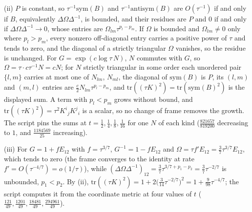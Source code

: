 (ii) $P$ is constant, so $\tau^{-1}\mathrm{sym}(B)$ and $\tau^{-1}\mathrm{antisym}(B)$ are $O(\tau^{-1})$ if and only if $B$, equivalently $\Delta\Omega\Delta^{-1}$, is bounded, and their residues are $P$ and $0$ if and only if $\Delta\Omega\Delta^{-1} \to 0$, whose entries are $\Omega_{lm}\tau^{p_{l} - p_{m}}$. If $\Omega$ is bounded and $\Omega_{lm} \neq 0$ only where $p_{l} > p_{m}$, every nonzero off-diagonal entry carries a positive power of $\tau$ and tends to zero, and the diagonal of a strictly triangular $\Omega$ vanishes, so the residue is unchanged. For $G = \exp(c\log\tau\,N)$, $N$ commutes with $G$, so $\Omega = \tau\cdot c\tau^{-1}N = cN$; for $N$ strictly triangular in some order each unordered pair $\{l, m\}$ carries at most one of $N_{lm}$, $N_{ml}$, the diagonal of $\mathrm{sym}(B)$ is $P$, its $(l,m)$ and $(m,l)$ entries are $\tfrac{c}{2}N_{lm}\tau^{p_{l} - p_{m}}$, and $\mathrm{tr}((\tau K)^{2}) = \mathrm{tr}(\mathrm{sym}(B)^{2})$ is the displayed sum. A term with $p_{l} < p_{m}$ grows without bound, and $\mathrm{tr}((\tau K)^{2}) = \tau^{2}K^{i}{}_{j}K^{j}{}_{i}$ is a scalar, so no change of frame removes the growth. The script pins the sums at $t = \tfrac12, \tfrac14, \tfrac18, \tfrac1{16}$ for one $N$ of each kind ($\tfrac{821657}{819200}$ decreasing to $1$, and $\tfrac{1184569}{25}$ increasing).

(iii) For $G = 1 + fE_{12}$ with $f = \tau^{3/7}$, $G^{-1} = 1 - fE_{12}$ and $\Omega = \tau f'E_{12} = \tfrac37\tau^{3/7}E_{12}$, which tends to zero (the frame converges to the identity at rate $f' = O(\tau^{-4/7}) = o(1/\tau)$), while $(\Delta\Omega\Delta^{-1})_{12} = \tfrac37\tau^{3/7 + p_{1} - p_{2}} = \tfrac37\tau^{-2/7}$ is unbounded, $p_{1} < p_{2}$. By (ii), $\mathrm{tr}((\tau K)^{2}) = 1 + 2\bigl(\tfrac{3}{14}\tau^{-2/7}\bigr)^{2} = 1 + \tfrac{9}{98}\tau^{-4/7}$; the script computes it from the coordinate metric at four values of $t$ ($\tfrac{121}{49}, \tfrac{1201}{49}, \tfrac{18481}{49}, \tfrac{294961}{49}$).

